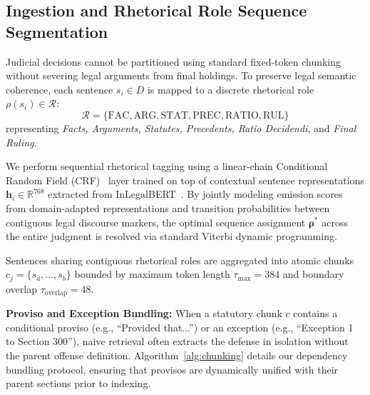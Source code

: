 \documentclass[conference]{IEEEtran}
\begin{document}
\subsection{Ingestion and Rhetorical Role Sequence Segmentation}
Judicial decisions cannot be partitioned using standard fixed-token chunking without severing legal arguments from final holdings. To preserve legal semantic coherence, each sentence $s_i \in D$ is mapped to a discrete rhetorical role $\rho(s_i) \in \mathcal{R}$:
\begin{equation}
\mathcal{R} = \{\text{FAC}, \text{ARG}, \text{STAT}, \text{PREC}, \text{RATIO}, \text{RUL}\}
\end{equation}
representing \textit{Facts, Arguments, Statutes, Precedents, Ratio Decidendi}, and \textit{Final Ruling}.

We perform sequential rhetorical tagging using a linear-chain Conditional Random Field (CRF)~\cite{lafferty2001crf} layer trained on top of contextual sentence representations $\mathbf{h}_i \in \mathbb{R}^{768}$ extracted from InLegalBERT~\cite{paul2022pre}. By jointly modeling emission scores from domain-adapted representations and transition probabilities between contiguous legal discourse markers, the optimal sequence assignment $\mathbf{\rho}^*$ across the entire judgment is resolved via standard Viterbi dynamic programming.

Sentences sharing contiguous rhetorical roles are aggregated into atomic chunks $c_j = \{s_a, \dots, s_b\}$ bounded by maximum token length $\tau_{\max} = 384$ and boundary overlap $\tau_{\text{overlap}} = 48$. 

\textbf{Proviso and Exception Bundling:} When a statutory chunk $c$ contains a conditional proviso (e.g., ``Provided that...'') or an exception (e.g., ``Exception 1 to Section 300''), naive retrieval often extracts the defense in isolation without the parent offense definition. Algorithm~\ref{alg:chunking} details our dependency bundling protocol, ensuring that provisos are dynamically unified with their parent sections prior to indexing.
\end{document}
